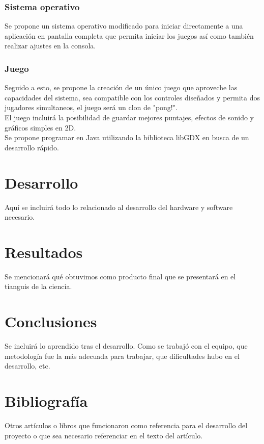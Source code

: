 \documentclass[letterpaper]{article}
\begin{document}
\begin{multicols}{2}
\subsubsection{Sistema operativo}
Se propone un sistema operativo modificado para iniciar directamente a una
aplicación en pantalla completa que permita iniciar los juegos así como también
realizar ajustes en la consola.


\subsubsection{Juego}
Seguido a esto, se propone la creación de un único juego que aproveche las
capacidades del sistema, sea compatible con los controles diseñados y permita
dos jugadores simultaneos, el juego será un clon de "pong!".\\
El juego incluirá la posibilidad de guardar mejores puntajes, efectos de sonido
y gráficos simples en 2D.\\
Se propone programar en Java utilizando la biblioteca libGDX en busca de un
desarrollo rápido.
\section{Desarrollo}
Aquí se incluirá todo lo relacionado al desarrollo del hardware y software
necesario.

\section{Resultados}
Se mencionará qué obtuvimos como producto final que se presentará en el tianguis
de la ciencia.

\section{Conclusiones}
Se incluirá lo aprendido tras el desarrollo. Como se trabajó con el equipo, que
metodología fue la más adecuada para trabajar, que dificultades hubo en el
desarrollo, etc.

\section{Bibliografía}
Otros artículos o libros que funcionaron como referencia para el desarrollo del
proyecto o que sea necesario referenciar en el texto del artículo.

\end{multicols}
\end{document}
